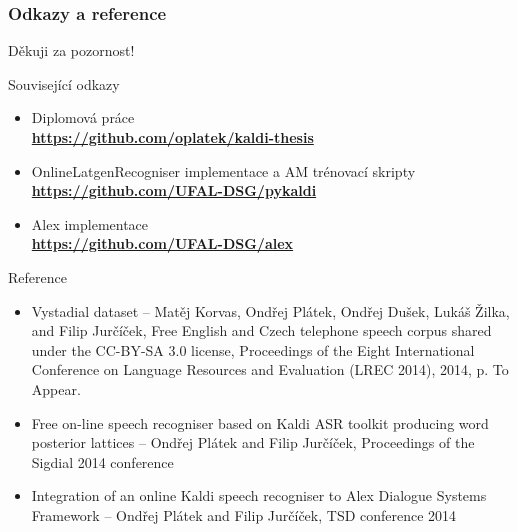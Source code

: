 \begin{frame}\frametitle{Odkazy a reference}
    Děkuji za pozornost! \\
    \begin{exampleblock}{Související odkazy}
        \begin{itemize}
            \item Diplomová práce \\ {\bf \url{https://github.com/oplatek/kaldi-thesis}}
            \item OnlineLatgenRecogniser implementace a AM trénovací skripty \\ {\bf \url{https://github.com/UFAL-DSG/pykaldi}} 
            \item Alex implementace \\ {\bf \url{https://github.com/UFAL-DSG/alex}} 
        \end{itemize}
    \end{exampleblock}
    \begin{exampleblock}{Reference}
        \begin{itemize}
            \item Vystadial dataset --  \tiny{Matěj Korvas, Ondřej Plátek, Ondřej Dušek, Lukáš Žilka, and Filip Jurčíček, Free English and Czech telephone speech corpus shared under the CC-BY-SA 3.0 license, Proceedings of the Eight International Conference on Language Resources and Evaluation (LREC 2014), 2014, p. To Appear.}
            \item Free on-line speech recogniser based on Kaldi ASR toolkit producing word posterior lattices -- \tiny{Ondřej Plátek and Filip Jurčíček, Proceedings of the Sigdial 2014 conference}
            \item Integration of an online Kaldi speech recogniser to Alex Dialogue Systems Framework -- \tiny{Ondřej Plátek and Filip Jurčíček, TSD conference 2014}
        \end{itemize}
    \end{exampleblock}
\end{frame}

